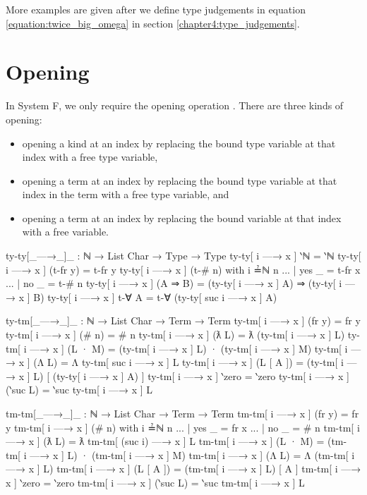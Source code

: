 \documentclass[logo,bsc,singlespacing,parskip,online]{infthesis}
\renewenvironment{code}{\mintedcopy[breaklines,breaksymbolleft=\;]{agda}}{\endmintedcopy}
\begin{document}
More examples are given after we define type judgements in equation \ref{equation:twice_big_omega}
in section \ref{chapter4:type_judgements}.

\section{Opening}
In System F, we only require the opening operation \citep{chargueraud_locally_2012}. There are three
kinds of opening:
\begin{itemize}
  \item opening a kind at an index by replacing the bound type variable at that index with a free
        type variable,
  \item opening a term at an index by replacing the bound type variable at that index in the term
        with a free type variable, and
  \item opening a term at an index by replacing the bound variable at that index with a free
        variable.
\end{itemize}

\begin{code}
  ty-ty[_—→_]_ : ℕ → List Char → Type → Type
  ty-ty[ i —→ x ] ‵ℕ = ‵ℕ
  ty-ty[ i —→ x ] (t-fr y) = t-fr y
  ty-ty[ i —→ x ] (t-# n) with i ≟ℕ n
  ... | yes _ = t-fr x
  ... | no  _ = t-# n
  ty-ty[ i —→ x ] (A ⇒ B) = (ty-ty[ i —→ x ] A) ⇒ (ty-ty[ i —→ x ] B)
  ty-ty[ i —→ x ] t-∀ A = t-∀ (ty-ty[ suc i —→ x ] A)

  ty-tm[_—→_]_ : ℕ → List Char → Term → Term
  ty-tm[ i —→ x ] (fr y) = fr y
  ty-tm[ i —→ x ] (# n) = # n
  ty-tm[ i —→ x ] (ƛ L) = ƛ (ty-tm[ i —→ x ] L)
  ty-tm[ i —→ x ] (L · M) = (ty-tm[ i —→ x ] L) · (ty-tm[ i —→ x ] M)
  ty-tm[ i —→ x ] (Λ L) = Λ ty-tm[ suc i —→ x ] L
  ty-tm[ i —→ x ] (L [ A ]) = (ty-tm[ i —→ x ] L) [ (ty-ty[ i —→ x ] A) ]
  ty-tm[ i —→ x ] ‵zero = ‵zero
  ty-tm[ i —→ x ] (‵suc L) = ‵suc ty-tm[ i —→ x ] L

  tm-tm[_—→_]_ : ℕ → List Char → Term → Term
  tm-tm[ i —→ x ] (fr y) = fr y
  tm-tm[ i —→ x ] (# n) with i ≟ℕ n
  ... | yes _ = fr x
  ... | no  _ = # n
  tm-tm[ i —→ x ] (ƛ L) = ƛ tm-tm[ (suc i) —→ x ] L
  tm-tm[ i —→ x ] (L · M) = (tm-tm[ i —→ x ] L) · (tm-tm[ i —→ x ] M)
  tm-tm[ i —→ x ] (Λ L) = Λ (tm-tm[ i —→ x ] L)
  tm-tm[ i —→ x ] (L [ A ]) = (tm-tm[ i —→ x ] L) [ A ]
  tm-tm[ i —→ x ] ‵zero = ‵zero
  tm-tm[ i —→ x ] (‵suc L) = ‵suc tm-tm[ i —→ x ] L
\end{code}
\end{document}
